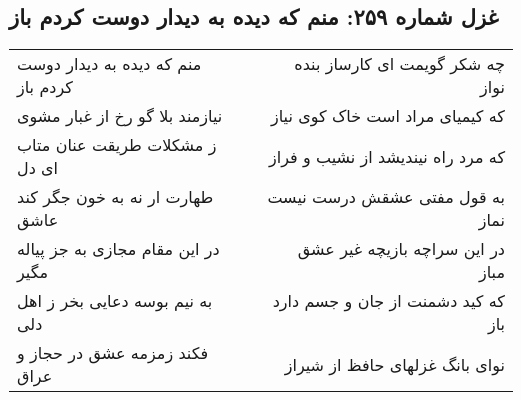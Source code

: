 \begin{center}
\section*{غزل شماره ۲۵۹: منم که دیده به دیدار دوست کردم باز}
\label{sec:sh259}
\begin{longtable}{l p{0.5cm} r}
منم که دیده به دیدار دوست کردم باز
&&
چه شکر گویمت ای کارساز بنده نواز
\\
نیازمند بلا گو رخ از غبار مشوی
&&
که کیمیای مراد است خاک کوی نیاز
\\
ز مشکلات طریقت عنان متاب ای دل
&&
که مرد راه نیندیشد از نشیب و فراز
\\
طهارت ار نه به خون جگر کند عاشق
&&
به قول مفتی عشقش درست نیست نماز
\\
در این مقام مجازی به جز پیاله مگیر
&&
در این سراچه بازیچه غیر عشق مباز
\\
به نیم بوسه دعایی بخر ز اهل دلی
&&
که کید دشمنت از جان و جسم دارد باز
\\
فکند زمزمه عشق در حجاز و عراق
&&
نوای بانگ غزلهای حافظ از شیراز
\\
\end{longtable}
\end{center}
